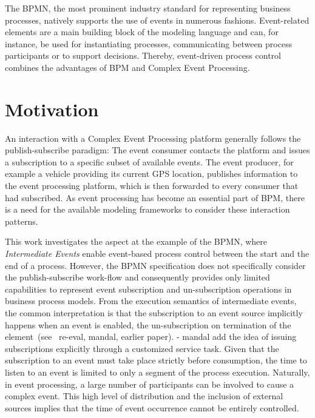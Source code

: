 The \ac{BPMN}, the most prominent industry standard for representing business processes,%
natively supports the use of events in numerous fashions. Event-related elements are a main building block of the modeling language and can, for instance, be used for instantiating processes, communicating between process participants or to support decisions.
Thereby, event-driven process control combines the advantages of \acl{BPM} and Complex Event Processing.


\section{Motivation}

An interaction with a Complex Event Processing platform generally follows the publish-subscribe paradigm: The event consumer contacts the platform and issues a subscription to a specific subset of available events.
The event producer, for example a vehicle providing its current GPS location, publishes information to the event processing platform, which is then forwarded to every consumer that had subscribed.
As event processing has become an essential part of \ac{BPM}, there is a need for the available modeling frameworks to consider these interaction patterns.

This work investigates the aspect at the example of the \ac{BPMN}, where \textit{Intermediate Events} enable event-based process control between the start and the end of a process. %
However, the BPMN specification does not specifically consider the publish-subscribe work-flow and consequently provides only limited capabilities to represent event subscription and un-subscription operations in business process models.
From the execution semantics of intermediate events, the common interpretation is that the subscription to an event source implicitly happens when an event is enabled, the un-subscription on termination of the element~(see~\cite{} re-eval, mandal, earlier paper).
- mandal add the idea of issuing subscriptions explicitly through a customized service task.
Given that the subscription to an event must take place strictly before consumption, the time to listen to an event is limited to only a segment of the process execution.
Naturally, in event processing, a large number of participants can be involved to cause a complex event. This high level of distribution and the inclusion of external sources implies that the time of event occurrence cannot be entirely controlled.

